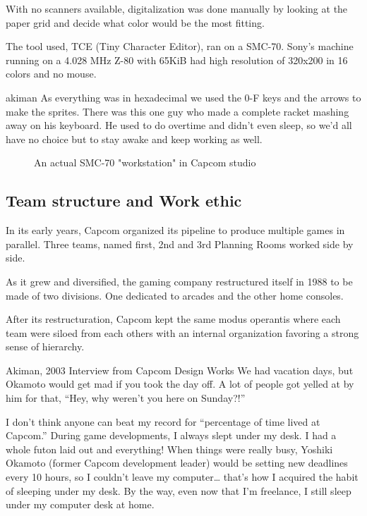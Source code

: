 With no scanners available, digitalization was done manually by looking at the paper grid and decide what color would be the most fitting.




The tool used, TCE (Tiny Character Editor), ran on a SMC-70. Sony's machine running on a 4.028 MHz Z-80 with 65KiB had high resolution of 320x200 in 16 colors and no mouse.

\begin{q}{akiman\cite{ar20160404}}
  As everything was in hexadecimal we used the 0-F keys and the arrows to make the sprites. There was this one guy who made a complete racket mashing away on his keyboard. He used to do overtime and didn't even sleep, so we'd all have no choice but to stay awake and keep working as well.
\end{q}

 \begin{figure}[H]
\caption*{An actual SMC-70 "workstation" in Capcom studio}
\end{figure}

\subsection{Team structure and Work ethic}

In its early years, Capcom organized its pipeline to produce multiple games in parallel. Three teams, named first, 2nd and 3rd Planning Rooms worked side by side. 

As it grew and diversified, the gaming company restructured itself in 1988 to be made of two divisions. One dedicated to arcades and the other home consoles. 

After its restructuration, Capcom kept the same modus operantis where each team were siloed from each others with an internal organization favoring a strong sense of hierarchy. 



\begin{q}{Akiman, 2003 Interview from Capcom Design Works}
  We had vacation days, but Okamoto would get mad if you took the day off. A lot of people got yelled at by him for that, “Hey, why weren’t you here on Sunday?!”

  I don’t think anyone can beat my record for “percentage of time lived at Capcom.” During game developments, I always slept under my desk. I had a whole futon laid out and everything! When things were really busy, Yoshiki Okamoto (former Capcom development leader) would be setting new deadlines every 10 hours, so I couldn’t leave my computer… that’s how I acquired the habit of sleeping under my desk. By the way, even now that I’m freelance, I still sleep under my computer desk at home.
  \end{q}


